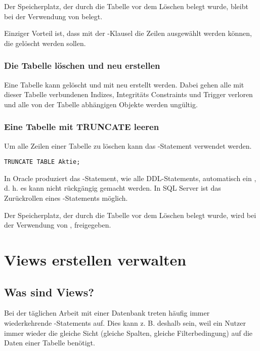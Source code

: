           \begin{merke}
            Der Speicherplatz, der durch die Tabelle vor dem Löschen belegt
            wurde, bleibt bei der Verwendung von  belegt.
          \end{merke}
          Einziger Vorteil ist, dass mit der -Klausel die
          Zeilen ausgewählt werden können, die gelöscht werden sollen.
        \subsubsection{Die Tabelle löschen und neu erstellen}
          \label{dropandrecreatetable}
          Eine Tabelle kann gelöscht und mit  neu
          erstellt werden. Dabei gehen alle mit dieser Tabelle verbundenen
          Indizes, Integritäts Constraints und Trigger verloren und alle von
          der Tabelle abhängigen Objekte werden ungültig.
        \subsubsection{Eine Tabelle mit TRUNCATE leeren}
          Um alle Zeilen einer Tabelle zu löschen kann das -Statement verwendet werden.
          \begin{lstlisting}[language=oracle_sql, caption={Zeilen mit TRUNCATE
          abschneiden},label=sql08_23]
TRUNCATE TABLE Aktie;
          \end{lstlisting}
\clearpage
          \begin{merke}
            In Oracle produziert das -Statement, wie
            alle DDL-Statements, automatisch ein , d. h.
            es kann nicht rückgängig gemacht werden. In SQL Server ist das
            Zurückrollen eines -Statements möglich.
          \end{merke}

          \begin{merke}
            Der Speicherplatz, der durch die Tabelle vor dem Löschen belegt
            wurde, wird bei der Verwendung von ,
            freigegeben.
          \end{merke}
    \section{Views erstellen verwalten}
      \subsection{Was sind Views?}
        Bei der täglichen Arbeit mit einer Datenbank treten häufig immer wiederkehrende \SELECT-Statements auf. Dies kann z. B. deshalb sein, weil ein Nutzer immer wieder die gleiche Sicht (gleiche Spalten, gleiche Filterbedingung) auf die Daten einer Tabelle benötigt.


